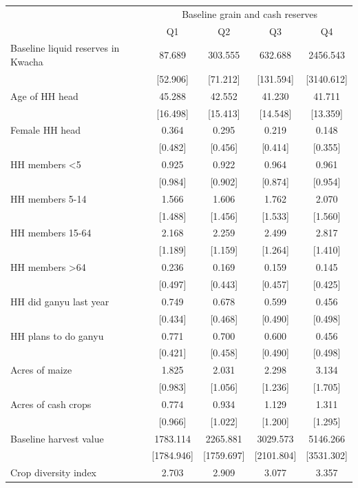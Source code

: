 \begin{tabular}{l cc cc}
\hline
& \multicolumn{4}{c}{Baseline grain and cash reserves} \\ 
 & Q1 & Q2 & Q3 & Q4 \\ 
\hline
Baseline liquid reserves in Kwacha & 87.689   & 303.555  & 632.688  & 2456.543 \\ 
 & [52.906] & [71.212] & [131.594] & [3140.612] \\ 
Age of HH head & 45.288   & 42.552   & 41.230   & 41.711   \\ 
 & [16.498] & [15.413] & [14.548] & [13.359] \\ 
Female HH head & 0.364    & 0.295    & 0.219    & 0.148    \\ 
 & [0.482] & [0.456] & [0.414] & [0.355] \\ 
HH members <5 & 0.925    & 0.922    & 0.964    & 0.961    \\ 
 & [0.984] & [0.902] & [0.874] & [0.954] \\ 
HH members 5-14 & 1.566    & 1.606    & 1.762    & 2.070    \\ 
 & [1.488] & [1.456] & [1.533] & [1.560] \\ 
HH members 15-64 & 2.168    & 2.259    & 2.499    & 2.817    \\ 
 & [1.189] & [1.159] & [1.264] & [1.410] \\ 
HH members >64 & 0.236    & 0.169    & 0.159    & 0.145    \\ 
 & [0.497] & [0.443] & [0.457] & [0.425] \\ 
HH did ganyu last year & 0.749    & 0.678    & 0.599    & 0.456    \\ 
 & [0.434] & [0.468] & [0.490] & [0.498] \\ 
HH plans to do ganyu & 0.771    & 0.700    & 0.600    & 0.456    \\ 
 & [0.421] & [0.458] & [0.490] & [0.498] \\ 
Acres of maize & 1.825    & 2.031    & 2.298    & 3.134    \\ 
 & [0.983] & [1.056] & [1.236] & [1.705] \\ 
Acres of cash crops & 0.774    & 0.934    & 1.129    & 1.311    \\ 
 & [0.966] & [1.022] & [1.200] & [1.295] \\ 
Baseline harvest value & 1783.114 & 2265.881 & 3029.573 & 5146.266 \\ 
 & [1784.946] & [1759.697] & [2101.804] & [3531.302] \\ 
Crop diversity index & 2.703    & 2.909    & 3.077    & 3.357    \\ 

\end{tabular}
